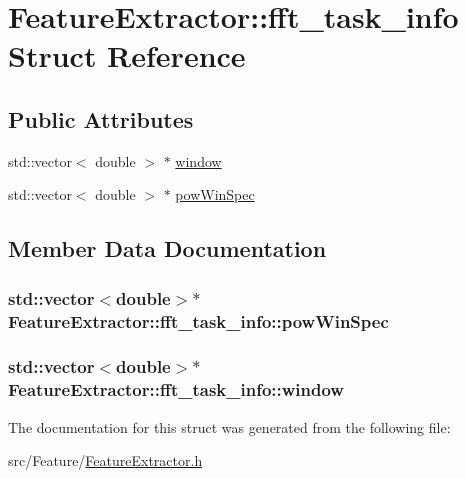 \hypertarget{struct_feature_extractor_1_1fft__task__info}{\section{Feature\+Extractor\+:\+:fft\+\_\+task\+\_\+info Struct Reference}
\label{struct_feature_extractor_1_1fft__task__info}
}
\subsection*{Public Attributes}
\begin{DoxyCompactItemize}
\item 
std\+::vector$<$ double $>$ $\ast$ \hyperlink{struct_feature_extractor_1_1fft__task__info_a5d5d85c3ca4d0be2d1a6c999055c5e1d}{window}
\item 
std\+::vector$<$ double $>$ $\ast$ \hyperlink{struct_feature_extractor_1_1fft__task__info_a7c7f7ce7d34a4866416725c03a68ac5b}{pow\+Win\+Spec}
\end{DoxyCompactItemize}


\subsection{Member Data Documentation}
\hypertarget{struct_feature_extractor_1_1fft__task__info_a7c7f7ce7d34a4866416725c03a68ac5b}{
\subsubsection[{pow\+Win\+Spec}]{\setlength{\rightskip}{0pt plus 5cm}std\+::vector$<$double$>$$\ast$ Feature\+Extractor\+::fft\+\_\+task\+\_\+info\+::pow\+Win\+Spec}}\label{struct_feature_extractor_1_1fft__task__info_a7c7f7ce7d34a4866416725c03a68ac5b}
\hypertarget{struct_feature_extractor_1_1fft__task__info_a5d5d85c3ca4d0be2d1a6c999055c5e1d}{
\subsubsection[{window}]{\setlength{\rightskip}{0pt plus 5cm}std\+::vector$<$double$>$$\ast$ Feature\+Extractor\+::fft\+\_\+task\+\_\+info\+::window}}\label{struct_feature_extractor_1_1fft__task__info_a5d5d85c3ca4d0be2d1a6c999055c5e1d}


The documentation for this struct was generated from the following file\+:\begin{DoxyCompactItemize}
\item 
src/\+Feature/\hyperlink{_feature_extractor_8h}{Feature\+Extractor.\+h}\end{DoxyCompactItemize}
